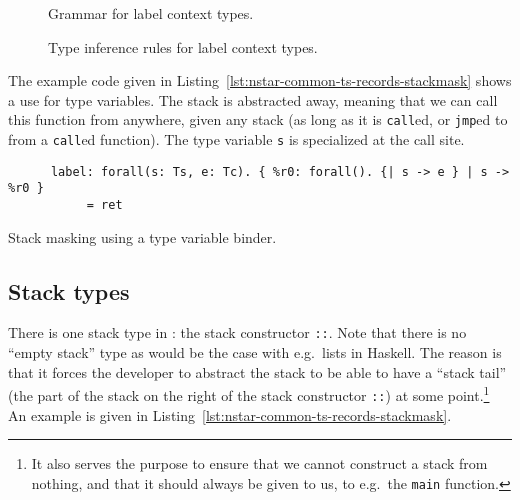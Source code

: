 \begin{figure}[htb]
  \centering
  \caption{Grammar for label context types.}
  \label{fig:nstar-common-ts-label-types-syntax}
\end{figure}

\begin{figure}[htb]
  \centering


  \caption{Type inference rules for label context types.}
  \label{fig:nstar-common-ts-label-types-typerules}
\end{figure}

The example code given in Listing~\ref{lst:nstar-common-ts-records-stackmask} shows a use for type variables.
The stack is abstracted away, meaning that we can call this function from anywhere, given any stack (as long as it is \texttt{call}ed, or \texttt{jmp}ed to from a \texttt{call}ed function).
The type variable \texttt{s} is specialized at the call site.

\begin{listing}[htb]
  \centering
  \begin{minipage}{0.90\textwidth}
    \begin{verbatim}
      label: forall(s: Ts, e: Tc). { %r0: forall(). {| s -> e } | s -> %r0 }
           = ret
    \end{verbatim}
  \end{minipage}
  \caption{Stack masking using a type variable binder.}
  \label{lst:nstar-common-ts-records-stackmask}
\end{listing}

\subsection{Stack types}\label{subsec:nstar-common-ts-stack}

There is one stack type in \nstar: the stack constructor \texttt{::}.
Note that there is no ``empty stack'' type as would be the case with e.g.\ lists in Haskell.
The reason is that it forces the developer to abstract the stack to be able to have a ``stack tail'' (the part of the stack on the right of the stack constructor \texttt{::}) at some point.\footnote{It also serves the purpose to ensure that we cannot construct a stack from nothing, and that it should always be given to us, to e.g.\ the \texttt{main} function.}
An example is given in Listing~\ref{lst:nstar-common-ts-records-stackmask}.

